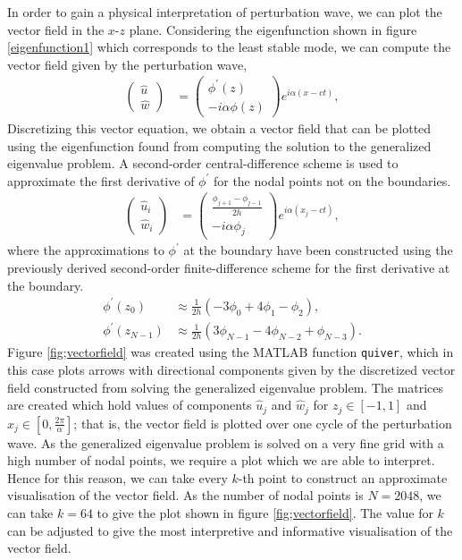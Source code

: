 \documentclass[a4paper, 12pt, twoside, openright]{article}
\numberwithin{equation}{section}
\begin{document}
In order to gain a physical interpretation of perturbation wave, we can plot the vector field in the $x$-$z$ plane. Considering the eigenfunction shown in figure \ref{eigenfunction1} which corresponds to the least stable mode, we can compute the vector field given by the perturbation wave,
\begin{align}
\begin{pmatrix}
\hat u \\ \hat w 
\end{pmatrix}
&= 
\begin{pmatrix}
\phi^{\prime}(z) \\ -i\alpha\phi(z)  
\end{pmatrix}
e^{i\alpha(x-ct)},
\end{align}  
Discretizing this vector equation, we obtain a vector field that can be plotted using the eigenfunction found from computing the solution to the generalized eigenvalue problem. A second-order central-difference scheme is used to approximate the first derivative of $\phi^{\prime}$ for the nodal points not on the boundaries.
\begin{align}
\begin{pmatrix}
\hat u_i \\ \hat w_i 
\end{pmatrix}
&= 
\begin{pmatrix}
\frac{\phi_{j+1}-\phi_{j-1}}{2h} \\ -i\alpha\phi_{j}  
\end{pmatrix}
e^{i\alpha(x_j-ct)},
\end{align}
where the approximations to $\phi^{\prime}$ at the boundary have been constructed using the previously derived second-order finite-difference scheme for the first derivative at the boundary. 
\begin{align}
\phi^{\prime} (z_0) &\approx \frac{1}{2h}\left(-3\phi_0 + 4\phi_1-\phi_2 \right),\\
\phi^{\prime}(z_{N-1}) &\approx \frac{1}{2h}\left(3\phi_{N-1} - 4\phi_{N-2}+\phi_{N-3} \right).
\end{align}
Figure \ref{fig;vectorfield} was created using the MATLAB function \verb+quiver+, which in this case plots arrows with directional components given by the discretized vector field constructed from solving the generalized eigenvalue problem. The matrices are created which hold values of components $\hat u_j$ and $\hat w_j$ for $z_j \in [-1,1]$ and $x_j\in [0,\frac{2\pi}{\alpha}]$; that is, the vector field is plotted over one cycle of the perturbation wave. As the generalized eigenvalue problem is solved on a very fine grid with a high number of nodal points, we require a plot which we are able to interpret. Hence for this reason, we can take every $k$-th point to construct an approximate visualisation of the vector field. As the number of nodal points is $N=2048$, we can take $k=64$ to give the plot shown in figure \ref{fig;vectorfield}. The value for $k$ can be adjusted to give the most interpretive and informative visualisation of the vector field. %
\end{document}
